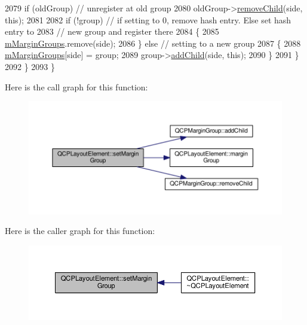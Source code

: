 \begin{DoxyCode}
2079       \textcolor{keywordflow}{if} (oldGroup) \textcolor{comment}{// unregister at old group}
2080         oldGroup->\hyperlink{class_q_c_p_margin_group_a20ab3286062957d99b58db683fe725b0}{removeChild}(side, \textcolor{keyword}{this});
2081 
2082       \textcolor{keywordflow}{if} (!group) \textcolor{comment}{// if setting to 0, remove hash entry. Else set hash entry to}
2083                   \textcolor{comment}{// new group and register there}
2084       \{
2085         \hyperlink{class_q_c_p_layout_element_ae027b5caf347c2fb635e797513712a32}{mMarginGroups}.remove(side);
2086       \} \textcolor{keywordflow}{else} \textcolor{comment}{// setting to a new group}
2087       \{
2088         \hyperlink{class_q_c_p_layout_element_ae027b5caf347c2fb635e797513712a32}{mMarginGroups}[side] = group;
2089         group->\hyperlink{class_q_c_p_margin_group_acb9c3a35acec655c2895b7eb95ee0524}{addChild}(side, \textcolor{keyword}{this});
2090       \}
2091     \}
2092   \}
2093 \}
\end{DoxyCode}


Here is the call graph for this function\+:\nopagebreak
\begin{figure}[H]
\begin{center}
\leavevmode
\includegraphics[width=350pt]{class_q_c_p_layout_element_a516e56f76b6bc100e8e71d329866847d_cgraph}
\end{center}
\end{figure}




Here is the caller graph for this function\+:\nopagebreak
\begin{figure}[H]
\begin{center}
\leavevmode
\includegraphics[width=350pt]{class_q_c_p_layout_element_a516e56f76b6bc100e8e71d329866847d_icgraph}
\end{center}
\end{figure}


